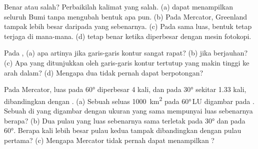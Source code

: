 \begin{exercise}[$\star$]\label{exo:g9:maps-of-the-earth:3}
Benar atau salah? Perbaikilah kalimat yang salah. (a)  dapat
menampilkan seluruh Bumi tanpa mengubah bentuk apa pun. (b) Pada 
Mercator, Greenland tampak lebih besar daripada yang sebenarnya. (c) Pada
 sama luas, bentuk tetap terjaga di mana-mana. (d)  tetap
benar ketika  diperbesar dengan mesin fotokopi.
\end{exercise}

\begin{exercise}[$\star$]\label{exo:g9:maps-of-the-earth:4}
Pada , (a) apa artinya jika garis-garis kontur sangat
rapat? (b) jika berjauhan? (c) Apa yang ditunjukkan oleh garis-garis kontur
tertutup yang makin tinggi ke arah dalam? (d) Mengapa dua 
tidak pernah dapat berpotongan?
\end{exercise}

\begin{exercise}[$\star\star$]\label{exo:g9:maps-of-the-earth:5}
Pada  Mercator, luas pada  \ang{60} diperbesar 4 kali, dan pada
 \ang{30} sekitar 1.33 kali, dibandingkan dengan .
(a) Sebuah  seluas \qty{1000}{km^2} pada \ang{60}\,LU digambar pada
. Sebuah  di  yang digambar dengan ukuran yang sama
mempunyai luas sebenarnya berapa? (b) Dua pulau yang luas sebenarnya sama
terletak pada \ang{30} dan pada \ang{60}. Berapa kali lebih besar pulau
kedua tampak dibandingkan dengan pulau pertama? (c) Mengapa  Mercator
tidak pernah dapat menampilkan ?
\end{exercise}

